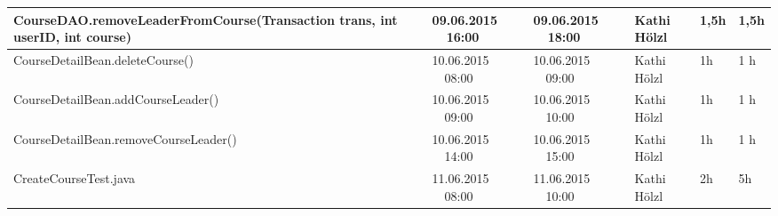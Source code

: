 \begin{landscape}
\begin{tabular}{|p{10.3cm}|p{3.2cm}|p{3.2cm}|p{3.5cm}|p{1.7cm}|p{1.5cm}|}
		\hline   CourseDAO.removeLeaderFromCourse(Transaction trans, int userID, int course) & 09.06.2015 \ \ 16:00     & 09.06.2015 \ \ 18:00       & Kathi Hölzl &   1,5h&   1,5h\\
		\hline   CourseDetailBean.deleteCourse()                             & 10.06.2015 \ \ 08:00     & 10.06.2015 \ \ 09:00       & Kathi Hölzl &   1h&   1 h\\
		\hline   CourseDetailBean.addCourseLeader()                          & 10.06.2015 \ \ 09:00     & 10.06.2015 \ \ 10:00       & Kathi Hölzl &   1h&   1 h\\
		\hline   CourseDetailBean.removeCourseLeader()                       & 10.06.2015 \ \ 14:00     & 10.06.2015 \ \ 15:00       & Kathi Hölzl &   1h&   1 h\\
		\hline   CreateCourseTest.java                                       & 11.06.2015 \ \ 08:00     & 11.06.2015 \ \ 10:00           & Kathi Hölzl  &      2h         &      5h        \\
		\hline 
	\end{tabular} \ \\
	\ \\
	

\end{landscape}
